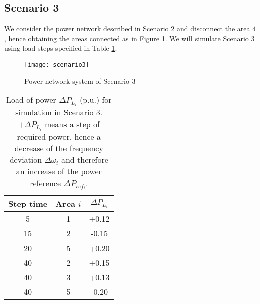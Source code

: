 \documentclass[a4paper]{article}
\begin{document}
          \subsection{Scenario 3}
               \label{sec:scenario3}
               We consider the power network described in Scenario 2 and disconnect the area $4$, hence obtaining the areas connected as in Figure \ref{fig:scenario3}.               
               We will simulate Scenario 3 using load steps specified in Table \ref{tab:simulationscen3}.
               \begin{figure}[!ht]
                 \centering
                 \texttt{[image: scenario3]}
                 \caption{Power network system of Scenario 3}
                 \label{fig:scenario3}
               \end{figure}
               \begin{table}[!ht]
                 \centering
                 \begin{tabular}{|c|c|c|}
                   \hline
                   Step time  &  Area $i$ & $\Delta P_{L_i}$ \\
                   \hline
                   5               &      1        &   +0.12             \\
                   \hline
                   15             &      2        &   -0.15             \\
                   \hline
                   20             &      5        &   +0.20             \\
                   \hline
                   40             &      2        &   +0.15             \\
                   \hline
                   40             &      3        &   +0.13            \\
                   \hline
                   40             &      5        &   -0.20            \\
                   \hline
                 \end{tabular}
                 \caption{Load of power $\Delta P_{L_i}$ (p.u.) for simulation in Scenario 3. $+\Delta P_{L_i}$ means a step of required power, hence a decrease of the frequency deviation $\Delta\omega_i$ and therefore an increase of the power reference $\Delta P_{ref_i}$.}
                 \label{tab:simulationscen3}
               \end{table}

     
\end{document}
